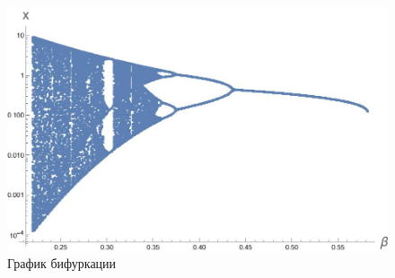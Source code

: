 \documentclass[14pt]{extarticle}
\begin{document}
        \begin{figure}[ht]
            \centering
            \includegraphics[width=\textwidth]{images/bifurcation.jpg}
            \caption{График бифуркации}
        \end{figure}
\end{document}
